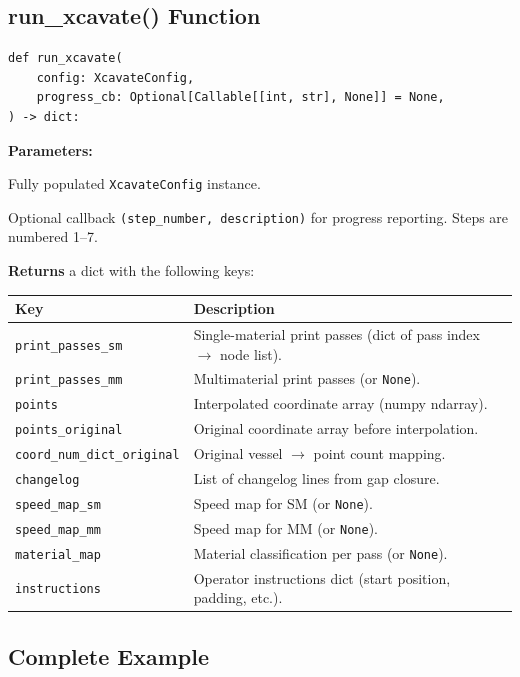 \documentclass[11pt,letterpaper]{article}
\newcommand{\code}[1]{\texttt{#1}}
\begin{document}
\subsection{run\_xcavate() Function}

\begin{lstlisting}[style=python]
def run_xcavate(
    config: XcavateConfig,
    progress_cb: Optional[Callable[[int, str], None]] = None,
) -> dict:
\end{lstlisting}

\textbf{Parameters:}
\begin{description}[leftmargin=2cm]
    \item[\code{config}] Fully populated \code{XcavateConfig} instance.
    \item[\code{progress\_cb}] Optional callback \code{(step\_number, description)}
    for progress reporting. Steps are numbered 1--7.
\end{description}

\textbf{Returns} a dict with the following keys:

\begin{tabularx}{\textwidth}{l X}
\toprule
\textbf{Key} & \textbf{Description} \\
\midrule
\code{print\_passes\_sm} & Single-material print passes (dict of pass index $\to$ node list). \\
\code{print\_passes\_mm} & Multimaterial print passes (or \code{None}). \\
\code{points} & Interpolated coordinate array (numpy ndarray). \\
\code{points\_original} & Original coordinate array before interpolation. \\
\code{coord\_num\_dict\_original} & Original vessel $\to$ point count mapping. \\
\code{changelog} & List of changelog lines from gap closure. \\
\code{speed\_map\_sm} & Speed map for SM (or \code{None}). \\
\code{speed\_map\_mm} & Speed map for MM (or \code{None}). \\
\code{material\_map} & Material classification per pass (or \code{None}). \\
\code{instructions} & Operator instructions dict (start position, padding, etc.). \\
\bottomrule
\end{tabularx}

\subsection{Complete Example}
\end{document}
